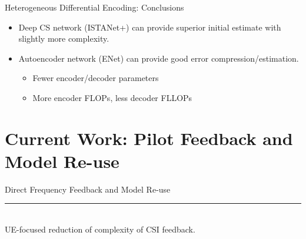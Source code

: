 \documentclass{beamer}
\begin{document}
  \begin{frame}{Heterogeneous Differential Encoding: Conclusions}
    \begin{itemize}
      \item Deep CS network (ISTANet+) can provide superior initial estimate with slightly more complexity.
      \item Autoencoder network (ENet) can provide good error compression/estimation.
      \begin{itemize}
        \item Fewer encoder/decoder parameters
        \item More encoder FLOPs, less decoder FLLOPs
      \end{itemize}
    \end{itemize}
  \end{frame}

\section{Current Work: Pilot Feedback and Model Re-use}

  \begin{frame}[plain]
    \vfill
    \centering
    \begin{beamercolorbox}[sep=8pt,center,shadow=true,rounded=true]{Direct Frequency Feedback and Model Re-use}
      \insertsectionhead\par%
      \color{davisblue}\noindent\rule{10cm}{1pt} \\
      \footnotesize{UE-focused reduction of complexity of CSI feedback.} 
    \end{beamercolorbox}
    \vfill
  \end{frame}


\end{document}
